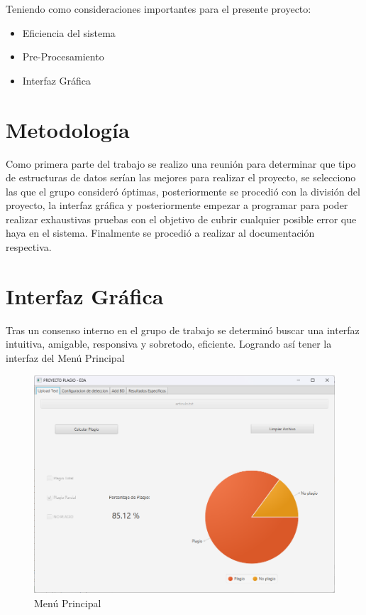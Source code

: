 \documentclass[a4paper]{article}
\begin{document}
\begin{multicols}{2}
Teniendo como consideraciones importantes para el presente proyecto:
\begin{itemize}
    \item Eficiencia del sistema
    \item Pre-Procesamiento
    \item Interfaz Gráfica
\end{itemize}


\section{ Metodología}
Como primera parte del trabajo se realizo una reunión para determinar que tipo de estructuras de datos serían las mejores para realizar el proyecto, se selecciono las que el grupo consideró óptimas, posteriormente se procedió con la división del proyecto, la interfaz gráfica y posteriormente empezar a programar para poder realizar exhaustivas pruebas con el objetivo de cubrir cualquier posible error que haya en el sistema.
Finalmente se procedió a realizar al documentación respectiva.

\section{Interfaz Gráfica}

Tras un consenso interno en el grupo de trabajo se determinó buscar una interfaz intuitiva, amigable, responsiva y sobretodo, eficiente.
Logrando así tener la interfaz del Menú Principal

 \begin{figure}[H]
  \centering
  \includegraphics[width=0.9\linewidth]{img/Menu.png}
  \caption{Menú Principal}
  \label{fig:imagen}
\end{figure}


\end{multicols}
\end{document}
